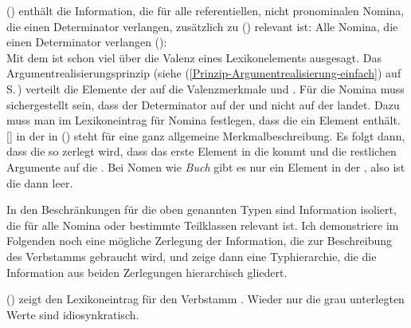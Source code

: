 () enthält die Information, die für alle referentiellen, nicht pronominalen Nomina,
die einen Determinator verlangen, zusätzlich zu () relevant ist:
\ea
Alle Nomina, die einen Determinator verlangen ():\\
\z
Mit dem \argstw ist schon viel über die Valenz eines Lexikonelements ausgesagt. Das
Argumentrealisierungsprinzip (siehe (\ref{Prinzip-Argumentrealisierung-einfach}) auf
S.\,\pageref{Prinzip-Argumentrealisierung-einfach}) verteilt die Elemente der \argstl auf die
Valenzmerkmale \spr und \comps. Für die Nomina muss sichergestellt sein, dass der Determinator auf
der \sprl und nicht auf der \compsl landet. Dazu muss man im Lexikoneintrag für Nomina festlegen,
dass die \sprl ein Element enthält. [] in der \sprl in () steht für eine ganz allgemeine
Merkmalbeschreibung. Es folgt dann, dass die \argstl so zerlegt wird, dass das erste
Element in die \sprl kommt und die restlichen Argumente auf die \compsl. Bei Nomen wie \emph{Buch}
gibt es nur ein Element in der \argstl, also ist die \compsl dann leer. 


In den Beschränkungen für die oben genannten Typen sind Information isoliert, die für alle Nomina oder bestimmte Teilklassen
relevant ist. Ich demonstriere im Folgenden noch eine mögliche Zerlegung der Information, die zur Beschreibung
des Verbstamms  gebraucht wird, und zeige dann eine Typhierarchie,
die die Information aus beiden Zerlegungen hierarchisch gliedert.

() zeigt den Lexikoneintrag für den Verbstamm . Wieder nur die
grau unterlegten Werte sind idiosynkratisch.
\ea
{}
\z

